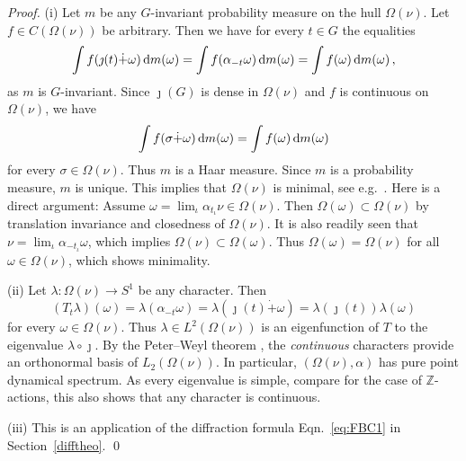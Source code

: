 \documentclass[11pt, a4wide]{amsart}
\numberwithin{lemma}{section}
\begin{document}
\begin{proof}
(i) Let $m$ be any $G$-invariant probability measure on the hull $\Omega(\nu)$. Let $f \in C(\Omega(\nu))$ be arbitrary. Then we have for every $t\in G$ the equalities
%
\begin{displaymath}
\int f(\jmath(t) \dot{+} \omega) \, {\rm d}m(\omega) = \int f(\alpha_{-t}\omega) \, {\rm d}m(\omega) = \int f(\omega) \, {\rm d}m(\omega)\,,
\end{displaymath}
%
as $m$ is $G$-invariant.
Since $\jmath(G)$ is dense in $\Omega(\nu)$ and $f$ is continuous on $\Omega(\nu)$, we have
%
\begin{displaymath}
\int f(\sigma \dot{+} \omega) \, {\rm d}m(\omega) = \int f(\omega) \, {\rm d}m(\omega)
\end{displaymath}
%
for every $\sigma \in \Omega(\nu)$.
Thus $m$ is a Haar measure. Since $m$ is a probability measure, $m$ is unique. This implies that $\Omega(\nu)$ is minimal, see e.g.~\cite[Thm.~6.17]{Wal}. Here is a direct argument: Assume $\omega=\lim_\iota \alpha_{t_\iota}\nu \in \Omega(\nu)$. Then $\Omega(\omega)\subset \Omega(\nu)$ by translation invariance and closedness of $\Omega(\nu)$. It is also readily seen that $\nu=\lim_\iota \alpha_{-t_\iota}\omega$, which implies $\Omega(\nu)\subset \Omega(\omega)$. Thus $\Omega(\omega)=\Omega(\nu)$ for all $\omega\in \Omega(\nu)$, which shows minimality.

\smallskip

\noindent (ii) Let $\lambda:\Omega(\nu)\to S^1$ be any character. Then
%
\begin{displaymath}
(T_t \lambda)(\omega) = \lambda(\alpha_{-t} \omega) = \lambda(\jmath(t) \dot{+} \omega) = \lambda(\jmath(t)) \lambda(\omega)
\end{displaymath}
%
for every  $\omega \in \Omega(\nu)$.
Thus $\lambda\in L^2(\Omega(\nu))$ is an eigenfunction of $T$ to the eigenvalue $\lambda \circ \jmath$. By the Peter--Weyl theorem \cite{S96}, the \textit{continuous} characters provide an orthonormal basis of $L_2(\Omega(\nu))$. In particular, $(\Omega(\nu), \alpha)$ has pure point dynamical spectrum. As every eigenvalue is simple, compare \cite[Ch.~3]{Wal} for the case of $\mathbb Z$-actions, this also shows that any character is continuous.

\smallskip

\noindent (iii) This is an application of the diffraction formula Eqn.~\eqref{eq:FBC1} in Section~\ref{difftheo}.
\qed
\end{proof}
\end{document}
